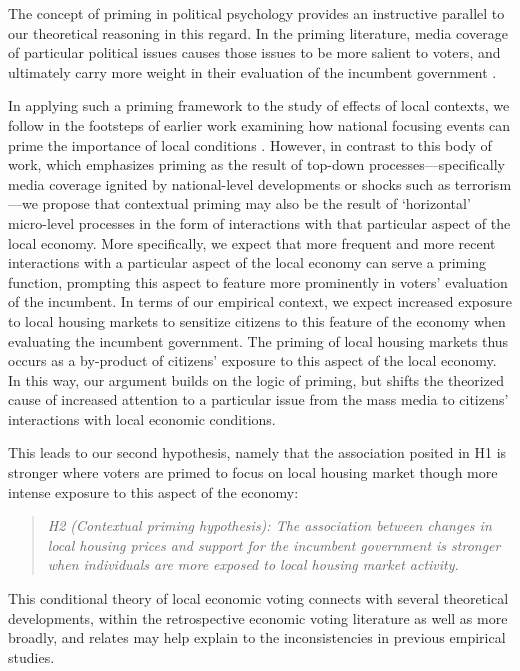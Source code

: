 \documentclass[12pt,a4paper]{article}
\begin{document}
	The concept of priming in political psychology provides an instructive parallel to our theoretical reasoning in this regard. In the priming literature, media coverage of particular political issues causes those issues to be more salient to voters, and ultimately carry more weight in their evaluation of the incumbent government \citep{iyengar1982experimental,iyengar1987news,krosnick1990altering}. 
	
	In applying such a priming framework to the study of effects of local contexts, we follow in the footsteps of earlier work examining how national focusing events can prime the importance of local conditions \citep[e.g.,] []{hopkins2010politicized,legewie2013terrorist}. However, in contrast to this body of work, which emphasizes priming as the result of top-down processes—specifically media coverage ignited by national-level developments or shocks such as terrorism—we propose that contextual priming may also be the result of `horizontal’ micro-level processes in the form of interactions with that particular aspect of the local economy. More specifically, we expect that more frequent and more recent interactions with a particular aspect of the local economy can serve a priming function, prompting this aspect to feature more prominently in voters’ evaluation of the incumbent. In terms of our empirical context, we expect increased exposure to local housing markets to sensitize citizens to this feature of the economy when evaluating the incumbent government. The priming of local housing markets thus occurs as a by-product of citizens’ exposure to this aspect of the local economy. In this way, our argument builds on the logic of priming, but shifts the theorized cause of increased attention to a particular issue from the mass media to citizens’ interactions with local economic conditions.
	
	This leads to our second hypothesis, namely that the association posited in H1 is stronger where voters are primed to focus on local housing market though more intense exposure to this aspect of the economy:
	
	\newcommand{\htwo}{the contextual priming hypothesis}
	\begin{quote}
		\textit{H2 (Contextual priming hypothesis): The association between changes in local housing prices and support for the incumbent government is stronger when individuals are more exposed to local housing market activity.}
	\end{quote}
	
	This conditional theory of local economic voting connects with several theoretical developments, within the retrospective economic voting literature as well as more broadly, and relates may help explain to the inconsistencies in previous empirical studies. 
	
\end{document}
